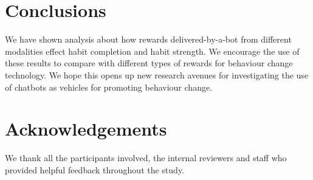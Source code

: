 \documentclass{scaffold/sigchi}
\begin{document}
\section{Conclusions}


We have shown analysis about how rewards delivered-by-a-bot from different modalities effect habit completion and habit strength. We encourage the use of these results to compare with different types of rewards for behaviour change technology. We hope this opens up new research avenues for investigating the use of chatbots as vehicles for promoting behaviour change.


\section{Acknowledgements}
We thank all the participants involved, the internal reviewers and staff who provided helpful feedback throughout the study.







\end{document}
